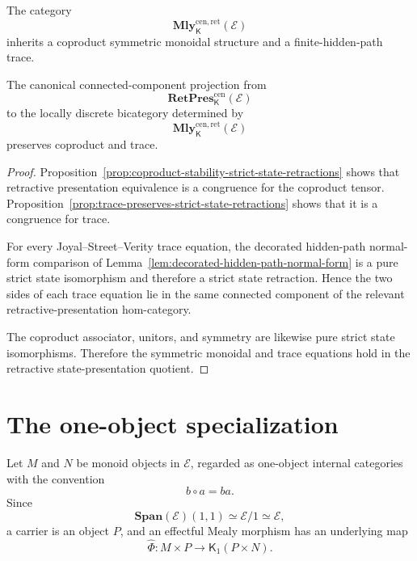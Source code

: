 \begin{theorem}
\label{thm:traced-retractive-state-presentation-quotient}
The category
\[
    \mathbf{Mly}^{\mathrm{cen},\mathrm{ret}}_{\mathsf K}(\mathcal E)
\]
inherits a coproduct symmetric monoidal structure and a finite-hidden-path
trace.

The canonical connected-component projection from
\[
    \mathbf{RetPres}^{\mathrm{cen}}_{\mathsf K}(\mathcal E)
\]
to the locally discrete bicategory determined by
\[
    \mathbf{Mly}^{\mathrm{cen},\mathrm{ret}}_{\mathsf K}(\mathcal E)
\]
preserves coproduct and trace.
\end{theorem}

\begin{proof}
Proposition~\ref{prop:coproduct-stability-strict-state-retractions} shows
that retractive presentation equivalence is a congruence for the coproduct
tensor.
Proposition~\ref{prop:trace-preserves-strict-state-retractions} shows that it
is a congruence for trace.

For every Joyal--Street--Verity trace equation, the decorated hidden-path
normal-form comparison of
Lemma~\ref{lem:decorated-hidden-path-normal-form} is a pure strict state
isomorphism and therefore a strict state retraction.  Hence the two sides of
each trace equation lie in the same connected component of the relevant
retractive-presentation hom-category.

The coproduct associator, unitors, and symmetry are likewise pure strict state
isomorphisms.  Therefore the symmetric monoidal and trace equations hold in
the retractive state-presentation quotient.
\end{proof}

\section{The one-object specialization}
\label{sec:one-object-effectful-mealy}

Let \(M\) and \(N\) be monoid objects in \(\mathcal E\), regarded as
one-object internal categories with the convention
\[
    b\circ a=ba.
\]
Since
\[
    \mathbf{Span}(\mathcal E)(1,1)
    \simeq
    \mathcal E/1
    \simeq
    \mathcal E,
\]
a carrier is an object \(P\), and an effectful Mealy morphism has an
underlying map
\[
    \widehat\Phi:
    M\times P
    \longrightarrow
    \mathsf K_1(P\times N).
\]

